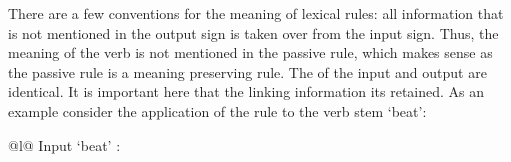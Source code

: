 \noindent
There are a few conventions for the meaning of lexical rules: all information that is not mentioned
in the output sign is taken over from the input sign. Thus, the meaning of the verb is not mentioned
in the passive rule, which makes sense as the passive rule is a meaning preserving rule. The \contvs of the input and output are identical. It is important here that the linking
information its retained. As an example consider the application of the rule to the verb stem
 `beat': 
\eal
\label{lr-passiv-beispiel}
\ex 
\begin{tabular}[t]{@{}l@{}}
Input  `beat' :\\
\end{tabular}
\ex 
